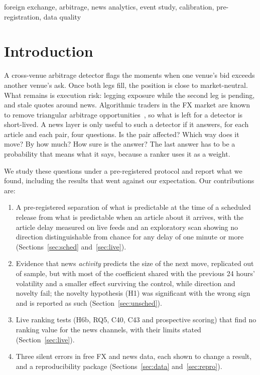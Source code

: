 \documentclass[conference]{IEEEtran}
\begin{document}
\begin{IEEEkeywords}
foreign exchange, arbitrage, news analytics, event study, calibration, pre-registration,
data quality
\end{IEEEkeywords}

\section{Introduction}
A cross-venue arbitrage detector flags the moments when one venue's bid exceeds another venue's
ask. Once both legs fill, the position is close to market-neutral. What remains is execution
risk: legging exposure while the second leg is pending, and stale quotes around news.
Algorithmic traders in the FX market are known to remove triangular arbitrage
opportunities~\cite{chaboud2014}, so what is left for a detector is short-lived. A news layer is only useful to such a detector if it answers, for each
article and each pair, four questions. Is the pair affected? Which way does it move? By how
much? How sure is the answer? The last answer has to be a probability that means what it says,
because a ranker uses it as a weight.

We study these questions under a pre-registered protocol and report what we found, including the
results that went against our expectation. Our contributions are:
\begin{enumerate}
\item A pre-registered separation of what is predictable at the time of a scheduled release from
what is predictable when an article about it arrives, with the article delay measured on live
feeds and an exploratory scan showing no direction distinguishable from chance for any delay of one minute or more
(Sections~\ref{sec:sched} and~\ref{sec:live}).
\item Evidence that news \emph{activity} predicts the size of the next move, replicated out of
sample, but with most of the coefficient shared with the previous 24 hours' volatility and a
smaller effect surviving the control, while direction and novelty fail; the novelty hypothesis (H1)
was significant with the wrong sign and is reported as such (Section~\ref{sec:unsched}).
\item Live ranking tests (H6b, RQ5, C40, C43 and prospective scoring) that find no ranking value
for the news channels, with their limits stated (Section~\ref{sec:live}).
\item Three silent errors in free FX and news data, each shown to change a result, and a
reproducibility package (Sections~\ref{sec:data} and~\ref{sec:repro}).
\end{enumerate}
\end{document}
